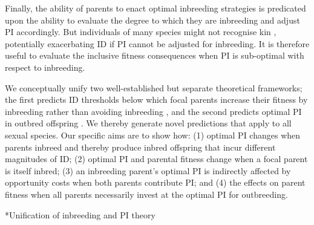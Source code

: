 \documentclass[12pt]{article}
\makeatletter
\renewcommand\section{\@startsection{section}{1}{0in}{-0.5\baselineskip}{0.1\baselineskip}{\normalfont\large\bfseries}}
\makeatother
\begin{document}
Finally, the ability of parents to enact optimal inbreeding strategies is predicated upon the ability to evaluate the degree to which they are inbreeding and adjust PI accordingly. But individuals of many species might not recognise kin \cite[][]{Penn2010}, potentially exacerbating ID if PI cannot be adjusted for inbreeding. It is therefore useful to evaluate the inclusive fitness consequences when PI is sub-optimal with respect to inbreeding.

We conceptually unify two well-established but separate theoretical frameworks; the first predicts ID thresholds below which focal parents increase their fitness by inbreeding rather than avoiding inbreeding \cite[][]{Parker1979}, and the second predicts optimal PI in outbred offspring \cite[][]{Macnair1978}. We thereby generate novel predictions that apply to all sexual species. Our specific aims are to show how: (1) optimal PI changes when parents inbreed and thereby produce inbred offspring that incur different magnitudes of ID; (2) optimal PI and parental fitness change when a focal parent is itself inbred; (3) an inbreeding parent's optimal PI is indirectly affected by opportunity costs when both parents contribute PI; and (4) the effects on parent fitness when all parents necessarily invest at the optimal PI for outbreeding. 

\section*{Unification of inbreeding and PI theory}
\end{document}
